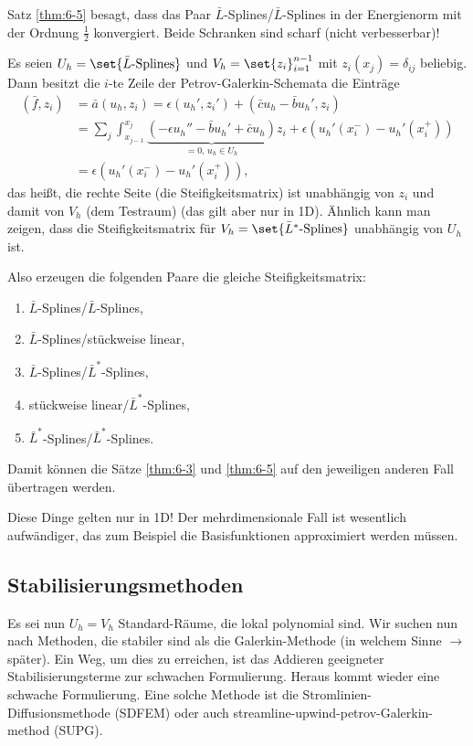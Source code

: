 Satz \ref{thm:6-5} besagt, dass das Paar $\bar L$-Splines/$\bar L$-Splines in der Energienorm mit der Ordnung $\frac 12$ konvergiert. Beide Schranken sind scharf (nicht verbesserbar)!

\begin{bemerkung}\label{rem:6-6}
  Es seien $U_{h} = \set{\bar L\text{-Splines}}$ und $V_{h} = \set{z_{i}}_{i = 1}^{n-1}$ mit $z_i(x_{j}) = \delta_{ij}$ beliebig. Dann besitzt die $i$-te Zeile der Petrov-Galerkin-Schemata die Einträge
  \begin{align*}
    (\bar f, z_{i}) &= \bar a (u_{h}, z_{i}) = \epsilon(u_{h}', z_{i}') + (\bar c u_{h} - \bar b u_{h}', z_{i})\\
    &= \sum_{j} \int_{x_{j-1}}^{x_{j}} \underbrace{(-\epsilon u_{h}'' - \bar b u_{h}' + \bar c u_{h})}_{= 0, \, u_{h} \in U_{h}}z_{i} + \epsilon(u_{h}'(x_{i}^{-}) - u_{h}'(x_{i}^{+})) \\
    &= \epsilon(u_{h}'(x_{i}^{-}) - u_{h}'(x_{i}^{+})), 
  \end{align*}
  das heißt, die rechte Seite (die Steifigkeitsmatrix) ist unabhängig von $z_{i}$ und damit von $V_{h}$ (dem Testraum) (das gilt aber nur in 1D). Ähnlich kann man zeigen, dass die Steifigkeitsmatrix für $V_{h} = \set{\bar L^{*}\text{-Splines}}$ unabhängig von $U_{h}$ ist. 

  Also erzeugen die folgenden Paare die gleiche Steifigkeitsmatrix: 
  \begin{enumerate}
  \item $\bar L$-Splines/$\bar L$-Splines,
  \item $\bar L$-Splines/stückweise linear,
  \item $\bar L$-Splines/$\bar L^{*}$-Splines, 
  \item stückweise linear/$\bar L^{*}$-Splines,
  \item $\bar L^{*}$-Splines/$\bar L^{*}$-Splines.
  \end{enumerate}
  Damit können die Sätze  \ref{thm:6-3} und  \ref{thm:6-5} auf den jeweiligen anderen Fall übertragen werden. 
\end{bemerkung}
Diese Dinge gelten nur in 1D! Der mehrdimensionale Fall ist wesentlich aufwändiger, das zum Beispiel die Basisfunktionen approximiert werden müssen. 

\subsection{Stabilisierungsmethoden}
\label{sec:stab}

Es sei nun $U_{h} = V_{h}$ Standard-Räume, die lokal polynomial sind. Wir suchen nun nach Methoden, die stabiler sind als die Galerkin-Methode (in welchem Sinne $\to$ später). Ein Weg, um dies zu erreichen, ist das Addieren geeigneter Stabilisierungsterme zur schwachen Formulierung. Heraus kommt wieder eine schwache Formulierung. Eine solche Methode ist die Stromlinien-Diffusionsmethode (SDFEM) oder auch streamline-upwind-petrov-Galerkin-method (SUPG). 

